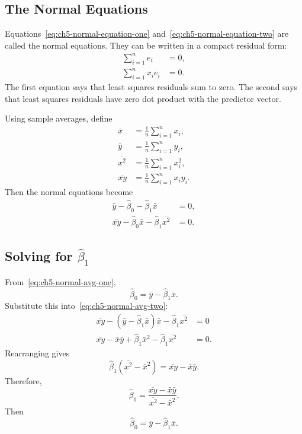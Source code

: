 {\subsection{The Normal Equations}

Equations~\eqref{eq:ch5-normal-equation-one} and~\eqref{eq:ch5-normal-equation-two} are called the normal equations.  They can be written in a compact residual form:
\begin{align}
  \sum_{i=1}^n e_i &=0, \\
  \sum_{i=1}^n x_i e_i &=0.
\end{align}
The first equation says that least squares residuals sum to zero.  The second says that least squares residuals have zero dot product with the predictor vector.

Using sample averages, define
\begin{align}
  \bar{x}&=\frac{1}{n}\sum_{i=1}^n x_i, \\
  \bar{y}&=\frac{1}{n}\sum_{i=1}^n y_i, \\
  \overline{x^2}&=\frac{1}{n}\sum_{i=1}^n x_i^2, \\
  \overline{xy}&=\frac{1}{n}\sum_{i=1}^n x_i y_i.
\end{align}
Then the normal equations become
\begin{align}
  \bar{y}-\widehat{\beta}_0-\widehat{\beta}_1\bar{x}&=0,
  \label{eq:ch5-normal-avg-one} \\
  \overline{xy}-\widehat{\beta}_0\bar{x}-\widehat{\beta}_1\overline{x^2}&=0.
  \label{eq:ch5-normal-avg-two}
\end{align}

\subsection{Solving for \texorpdfstring{$\widehat{\beta}_1$}{beta-hat 1}}

From~\eqref{eq:ch5-normal-avg-one},
\begin{equation}
  \widehat{\beta}_0=\bar{y}-\widehat{\beta}_1\bar{x}.
  \label{eq:ch5-beta0-from-beta1}
\end{equation}
Substitute this into~\eqref{eq:ch5-normal-avg-two}:
\begin{align}
  \overline{xy}-(\bar{y}-\widehat{\beta}_1\bar{x})\bar{x}-\widehat{\beta}_1\overline{x^2}&=0 \\
  \overline{xy}-\bar{x}\bar{y}+\widehat{\beta}_1\bar{x}^2-\widehat{\beta}_1\overline{x^2}&=0.
\end{align}
Rearranging gives
\begin{equation}
  \widehat{\beta}_1(\overline{x^2}-\bar{x}^2)=\overline{xy}-\bar{x}\bar{y}.
\end{equation}
Therefore,
\begin{equation}
  \boxed{\widehat{\beta}_1=\frac{\overline{xy}-\bar{x}\bar{y}}{\overline{x^2}-\bar{x}^2}.}
  \label{eq:ch5-beta1-raw-moment-form}
\end{equation}
Then
\begin{equation}
  \boxed{\widehat{\beta}_0=\bar{y}-\widehat{\beta}_1\bar{x}.}
  \label{eq:ch5-beta0-formula}
\end{equation}
}{
}
